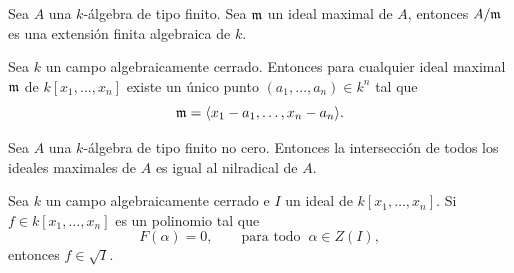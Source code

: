 \begin{corollary}
	Sea $A$ una $k$-álgebra de tipo finito. Sea $\mathfrak{m}$ un ideal maximal de $A$, entonces $A/\mathfrak{m}$ es una extensión finita algebraica de $k$.
\end{corollary}

\begin{corollary}
	Sea $k$ un campo algebraicamente cerrado. Entonces para cualquier ideal maximal $\mathfrak{m}$ de $k[x_1,\dots,x_n]$ existe un único punto $(a_1,\dots,a_n)\in k^n$ tal que
	\begin{equation*}
		\mathfrak{m}=\langle x_1-a_1,\dots,x_n-a_n\rangle.
	\end{equation*}
\end{corollary}

\begin{lemma}
	Sea $A$ una $k$-álgebra de tipo finito no cero. Entonces la intersección de todos los ideales maximales de $A$ es igual al nilradical de $A$.
\end{lemma}

\begin{theorem}
	Sea $k$ un campo algebraicamente cerrado e $I$ un ideal de $k[x_1,\dots,x_n]$. Si $f\in k[x_1,\dots,x_n]$ es un polinomio tal que 
	\begin{equation*}
		F(\alpha)=0,\qquad \text{para todo }\ \alpha\in Z(I),
	\end{equation*}
	entonces $f\in \sqrt{I}$.
\end{theorem}